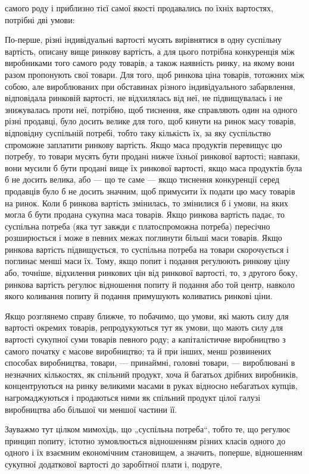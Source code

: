 самого роду і приблизно тієї самої якості продавались по їхніх
вартостях, потрібні дві умови:

По-перше, різні індивідуальні вартості мусять вирівнятися
в одну суспільну вартість, описану вище ринкову вартість, а для
цього потрібна конкуренція між виробниками того самого роду
товарів, а також наявність ринку, на якому вони разом пропонують свої товари. Для того, щоб ринкова
ціна товарів, тотожних між собою, але вироблюваних при обставинах різного
індивідуального забарвлення, відповідала ринковій вартості, не
відхилялась від неї, не підвищувалась і не знижувалась проти
неї, потрібно, щоб тиснення, яке справляють один на одного
різні продавці, було досить велике для того, щоб кинути на
ринок масу товарів, відповідну суспільній потребі, тобто таку
кількість їх, за яку суспільство спроможне заплатити ринкову
вартість. Якщо маса продуктів перевищує цю потребу, то товари мусять бути продані нижче їхньої
ринкової вартості; навпаки,
вони мусили б бути продані вище їх ринкової вартості, якщо
маса продуктів була б не досить велика, або — що те саме — якщо тиснення конкуренції серед продавців
було б не досить
значним, щоб примусити їх подати цю масу товарів на ринок.
Коли б ринкова вартість змінилась, то змінилися б і умови,
на яких могла б бути продана сукупна маса товарів. Якщо ринкова вартість падає, то суспільна потреба
(яка тут завжди
є платоспроможна потреба) пересічно розширюється і може
в певних межах поглинути більші маси товарів. Якщо ринкова
вартість підвищується, то суспільна потреба на товари скорочується і поглинає менші маси їх. Тому,
якщо попит і подання
регулюють ринкову ціну або, точніше, відхилення ринкових цін
від ринкової вартості, то, з другого боку, ринкова вартість регулює відношення попиту й подання або
той центр, навколо
якого коливання попиту й подання примушують коливатись
ринкові ціни.

Якщо розглянемо справу ближче, то побачимо, що умови,
які мають силу для вартості окремих товарів, репродукуються
тут як умови, що мають силу для вартості сукупної суми товарів певного роду; а капіталістичне
виробництво з самого
початку є масове виробництво; та й при інших, менш розвинених способах виробництва, товари, —
принаймні, головні товари, — вироблювані в незначних кількостях, як спільний продукт, хоча й
багатьох дрібних виробників, концентруються на ринку великими масами в руках відносно небагатьох
купців,
нагромаджуються і продаються ними як спільний продукт цілої
галузі виробництва або більшої чи меншої частини її.

Зауважмо тут цілком мимохідь, що „суспільна потреба“,
тобто те, що регулює принцип попиту, істотно зумовлюється
відношенням різних класів одного до одного і їх взаємним
економічним становищем, а значить, поперше, відношенням сукупної додаткової вартості до заробітної
плати і, подруге,
